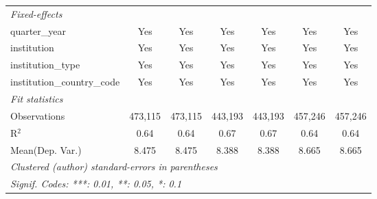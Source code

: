 \begin{tabular}{lcccccc}
   \midrule
   \emph{Fixed-effects}\\
   quarter\_year                      & Yes     & Yes        & Yes        & Yes       & Yes     & Yes\\  
   institution                        & Yes     & Yes        & Yes        & Yes       & Yes     & Yes\\  
   institution\_type                  & Yes     & Yes        & Yes        & Yes       & Yes     & Yes\\  
   institution\_country\_code         & Yes     & Yes        & Yes        & Yes       & Yes     & Yes\\  
   \midrule
   \emph{Fit statistics}\\
   Observations                       & 473,115 & 473,115    & 443,193    & 443,193   & 457,246 & 457,246\\  
   R$^2$                              & 0.64    & 0.64       & 0.67       & 0.67      & 0.64    & 0.64\\  
Mean(Dep. Var.) & 8.475 & 8.475 & 8.388 & 8.388 & 8.665 & 8.665 \\
   \midrule \midrule
   \multicolumn{7}{l}{\emph{Clustered (author) standard-errors in parentheses}}\\
   \multicolumn{7}{l}{\emph{Signif. Codes: ***: 0.01, **: 0.05, *: 0.1}}\\
\end{tabular}
\par\endgroup
